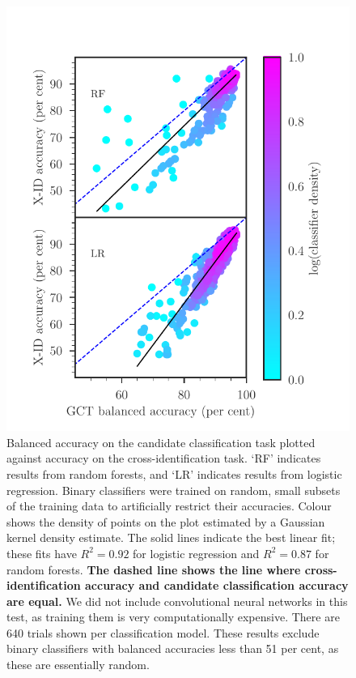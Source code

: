 \documentclass[fleqn,usenatbib,usedcolumn]{mnras}
\newcommand{\edited}[1]{{\bf {#1}}}
\begin{document}
    \begin{figure}
      \centering
      \includegraphics[width=\columnwidth]{images/gct-to-xid.pdf}
      \caption{Balanced accuracy on the candidate classification task plotted
      against accuracy on the cross-identification task. `RF' indicates
      results from random forests, and `LR' indicates results from logistic
      regression. Binary classifiers were trained on random, small subsets of the
      training data to artificially restrict their accuracies. Colour shows
      the density of points on the plot estimated by a Gaussian kernel density
      estimate. The solid lines indicate the best linear fit; these fits have
      $R^2 = 0.92$ for logistic regression and $R^2 = 0.87$ for random
      forests.
      \edited{The dashed line shows the line where cross-identification accuracy and candidate classification accuracy are equal.}
      We did not include convolutional neural networks in this test,
      as training them is very computationally expensive. There are 640 trials shown per classification model. These results
      exclude binary classifiers with balanced accuracies less than 51 per cent, as
      these are essentially random.
      \label{fig:gct-to-xid}}
    \end{figure}
\end{document}
